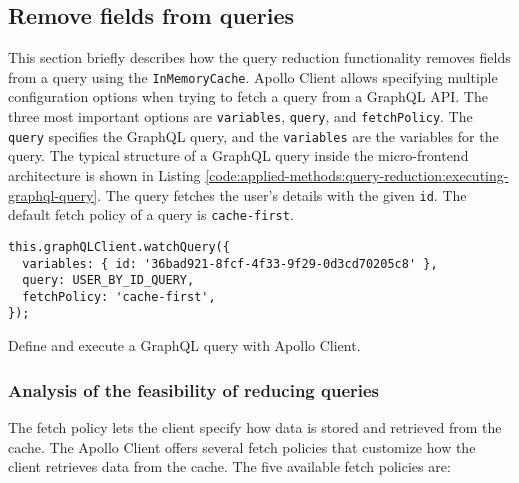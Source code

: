 \subsection{Remove fields from queries}\label{subsection:applied-methods:query-reduction:how-does-the-library-work}

This section briefly describes how the query reduction functionality removes fields from a query using the \texttt{InMemoryCache}. Apollo Client allows specifying multiple configuration options when trying to fetch a query from a GraphQL \ac{API}. The three most important options are \texttt{variables}, \texttt{query}, and \texttt{fetchPolicy}. The \texttt{query} specifies the GraphQL query, and the \texttt{variables} are the variables for the query. The typical structure of a GraphQL query inside the micro-frontend architecture is shown in Listing \ref{code:applied-methods:query-reduction:executing-graphql-query}. The query fetches the user's details with the given \texttt{id}. The default fetch policy of a query is \texttt{cache-first}.  

\ifshowListings
  \begin{listing}[H]
  \begin{verbatim}
this.graphQLClient.watchQuery({
  variables: { id: '36bad921-8fcf-4f33-9f29-0d3cd70205c8' },
  query: USER_BY_ID_QUERY,
  fetchPolicy: 'cache-first',
});
  \end{verbatim}
  \caption{Define and execute a GraphQL query with Apollo Client.}\label{code:applied-methods:query-reduction:executing-graphql-query}
  \end{listing}
\fi

\subsubsection{Analysis of the feasibility of reducing queries}

The fetch policy lets the client specify how data is stored and retrieved from the cache. The Apollo Client offers several fetch policies that customize how the client retrieves data from the cache. The five available fetch policies are: \cite{misc:-:applied-methods:query-reduction:apollo-client:queries}

